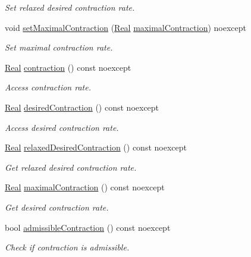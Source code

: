 \begin{DoxyCompactItemize}
\begin{DoxyCompactList}\small\item\em Set relaxed desired contraction rate. \end{DoxyCompactList}\item 
void \hyperlink{classSpacy_1_1Mixin_1_1ContractionRate_acc99ba536cd9a027baa50a1412d9d216_acc99ba536cd9a027baa50a1412d9d216}{set\+Maximal\+Contraction} (\hyperlink{classSpacy_1_1Real}{Real} \hyperlink{classSpacy_1_1Mixin_1_1ContractionRate_adea1388b1e492db1392f67cbe7e89302_adea1388b1e492db1392f67cbe7e89302}{maximal\+Contraction}) noexcept
\begin{DoxyCompactList}\small\item\em Set maximal contraction rate. \end{DoxyCompactList}\item 
\hyperlink{classSpacy_1_1Real}{Real} \hyperlink{classSpacy_1_1Mixin_1_1ContractionRate_a6c5e653393be91e468364733702e5334_a6c5e653393be91e468364733702e5334}{contraction} () const noexcept
\begin{DoxyCompactList}\small\item\em Access contraction rate. \end{DoxyCompactList}\item 
\hyperlink{classSpacy_1_1Real}{Real} \hyperlink{classSpacy_1_1Mixin_1_1ContractionRate_aaefb97e44b51fb6c8017eb2b40659d64_aaefb97e44b51fb6c8017eb2b40659d64}{desired\+Contraction} () const noexcept
\begin{DoxyCompactList}\small\item\em Access desired contraction rate. \end{DoxyCompactList}\item 
\hyperlink{classSpacy_1_1Real}{Real} \hyperlink{classSpacy_1_1Mixin_1_1ContractionRate_a569e3e3766394ccc46a13bd6ca122394_a569e3e3766394ccc46a13bd6ca122394}{relaxed\+Desired\+Contraction} () const noexcept
\begin{DoxyCompactList}\small\item\em Get relaxed desired contraction rate. \end{DoxyCompactList}\item 
\hyperlink{classSpacy_1_1Real}{Real} \hyperlink{classSpacy_1_1Mixin_1_1ContractionRate_adea1388b1e492db1392f67cbe7e89302_adea1388b1e492db1392f67cbe7e89302}{maximal\+Contraction} () const noexcept
\begin{DoxyCompactList}\small\item\em Get desired contraction rate. \end{DoxyCompactList}\item 
bool \hyperlink{classSpacy_1_1Mixin_1_1ContractionRate_a7dd3c5eb5a7d14d8269207e3d1203aec_a7dd3c5eb5a7d14d8269207e3d1203aec}{admissible\+Contraction} () const noexcept
\begin{DoxyCompactList}\small\item\em Check if contraction is admissible. \end{DoxyCompactList}\end{DoxyCompactItemize}


